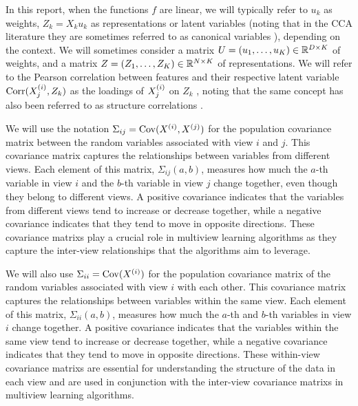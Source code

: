 In this report, when the functions $f$ are linear, we will typically refer to $u_k$ as \gls{weights}, $Z_k = X_k u_k$ as \gls{representations} or \gls{latent variables} (noting that in the CCA literature they are sometimes referred to as canonical variables \citep{borga_learning_1998}), depending on the context.
We will sometimes consider a matrix $U = \left(u_1, \dots, u_K\right) \in \mathbb{R}^{D \times K}$ of \gls{weights}, and a matrix $Z = \left(Z_1, \dots, Z_K\right) \in \mathbb{R}^{N \times K}$ of representations.
We will refer to the Pearson correlation between features and their respective latent variable $\operatorname{Corr}(X^{(i)}_j, Z_k)$ as the \gls{loadings} of $X^{(i)}_j$ on $Z_k$ \citep{rosipal2005overview, alpert1972interpretation, borga_learning_1998}, noting that the same concept has also been referred to as structure correlations \citep{meredith1964canonical}.

We will use the notation $\Sigma_{ij}=\mathrm{Cov}(X^{(i)}, X^{(j)})$ for the population \gls{covariance matrix} between the random variables associated with view $i$ and $j$. This \gls{covariance matrix} captures the relationships between variables from different views. Each element of this matrix, $\Sigma_{ij}(a,b)$, measures how much the $a$-th variable in view $i$ and the $b$-th variable in view $j$ change together, even though they belong to different views. A positive covariance indicates that the variables from different views tend to increase or decrease together, while a negative covariance indicates that they tend to move in opposite directions. These \glspl{covariance matrix} play a crucial role in multiview learning algorithms as they capture the inter-view relationships that the algorithms aim to leverage.

We will also use $\Sigma_{ii}= \mathrm{Cov}(X^{(i)})$ for the population \gls{covariance matrix} of the random variables associated with view $i$ with each other. This \gls{covariance matrix} captures the relationships between variables within the same view. Each element of this matrix, $\Sigma_{ii}(a,b)$, measures how much the $a$-th and $b$-th variables in view $i$ change together. A positive covariance indicates that the variables within the same view tend to increase or decrease together, while a negative covariance indicates that they tend to move in opposite directions. These within-view \glspl{covariance matrix} are essential for understanding the structure of the data in each view and are used in conjunction with the inter-view \glspl{covariance matrix} in multiview learning algorithms.

